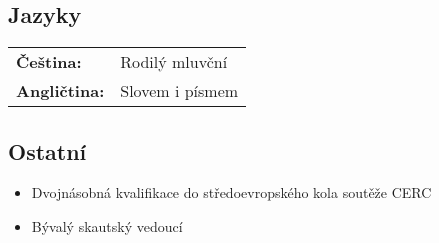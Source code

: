 \documentclass{article}
\begin{document}
\subsection*{Jazyky}
\begin{tabular}{>{\bfseries}l l}
	Čeština: & Rodilý mluvční \\
	Angličtina: & Slovem i písmem
\end{tabular}

\subsection*{Ostatní}
\begin{itemize}
	\item Dvojnásobná kvalifikace do středoevropského kola soutěže CERC
	\item Bývalý skautský vedoucí
\end{itemize}
\end{document}
